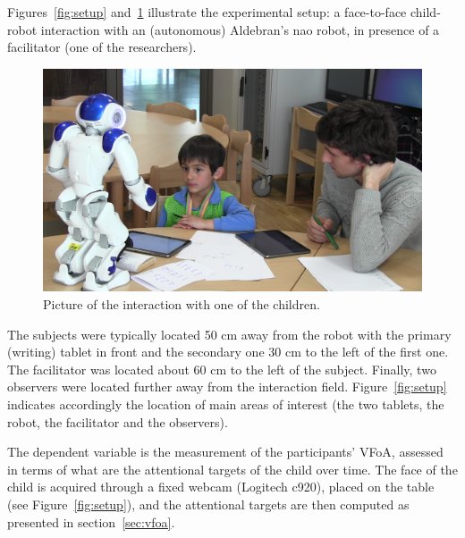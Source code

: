 \documentclass{sig-alternate}
\begin{document}
Figures~\ref{fig:setup} and~\ref{fig:realSetup} illustrate the experimental setup: a face-to-face
child-robot interaction with an (autonomous) Aldebran's {\sc nao} robot, in
presence of a facilitator (one of the researchers).

\begin{figure}[h!]
    \centering
    \includegraphics[width=1\columnwidth]{realSetup}
    \caption{\small Picture of the interaction with one of the children.}
    \label{fig:realSetup}
\end{figure}

The subjects were typically located 50 cm away from the robot with the primary
(writing) tablet in front and the secondary one 30 cm to the left of the first
one.  The facilitator was located about 60 cm to the left of the subject.
Finally, two observers were located further away from the interaction field.
Figure~\ref{fig:setup} indicates accordingly the location of main areas of
interest (the two tablets, the robot, the facilitator and the observers).


The dependent variable is the measurement of the participants' VFoA, assessed in
terms of what are the attentional targets of the child over time. The face of the child
is acquired through a fixed webcam (Logitech {\sf c920}), placed on the table
(see Figure~\ref{fig:setup}), and the attentional targets are then computed as
presented in section~\ref{sec:vfoa}.

\end{document}
